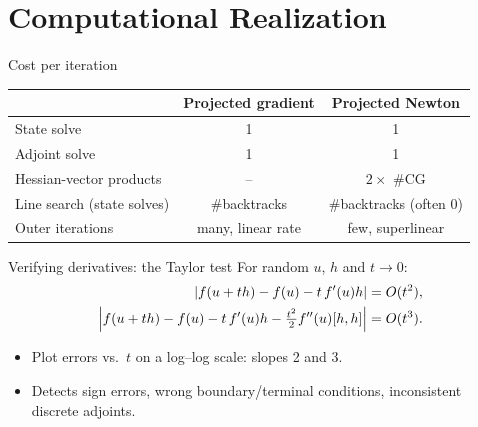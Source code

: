 \documentclass[main.tex]{subfiles}
\begin{document}
\section{Computational Realization}

\begin{frame}{Cost per iteration}
  \begin{center}
  \renewcommand{\arraystretch}{1.3}
  \begin{tabular}{@{}lcc@{}}
    \toprule
    & Projected gradient & Projected Newton \\
    \midrule
    State solve & 1 & 1 \\
    Adjoint solve & 1 & 1 \\
    Hessian-vector products & -- & $2 \times$ \#CG \\
    Line search (state solves) & \#backtracks & \#backtracks (often 0) \\
    Outer iterations & many, linear rate & few, superlinear \\
    \bottomrule
  \end{tabular}
  \end{center}
\end{frame}

\begin{frame}{Verifying derivatives: the Taylor test}
  For random $u$, $h$ and $t \to 0$:
  \begin{align*}
    \left\lvert f(u + th) - f(u) - t\,f'(u)h \right\rvert &= O(t^2),\\
    \left\lvert f(u + th) - f(u) - t\,f'(u)h - \tfrac{t^2}{2} f''(u)[h,h] \right\rvert &= O(t^3).
  \end{align*}
  \begin{itemize}
    \item Plot errors vs.\ $t$ on a log--log scale: slopes 2 and 3.
    \item Detects sign errors, wrong boundary/terminal conditions, inconsistent discrete adjoints.
  \end{itemize}
\end{frame}
\end{document}
